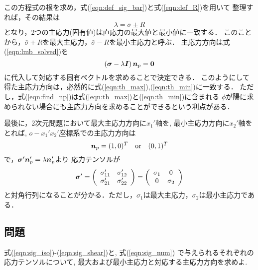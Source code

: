 \documentclass[10pt,a4j]{jbook}
\begin{document}
この方程式の根を求め，式(\ref{eqn:def_sig_bar})と式(\ref{eqn:def_R})を用いて
整理すれば，その結果は
\begin{equation}
	\lambda=\bar \sigma \pm R
	\label{eqn:lmb_solved}
\end{equation}
となり，2つの主応力(固有値)は直応力の最大値と最小値に一致する．
このことから，$\bar \sigma +R$を最大主応力，$\bar \sigma-R$を最小主応力と呼ぶ．
主応力方向は式(\ref{eqn:lmb_solved})を
\begin{equation}
	\left( \mbox{\boldmath $\sigma$} -\lambda \mbox{\boldmath $I$} \right) \mbox{\boldmath $n$}_p=\mbox{\boldmath $0$}
	\label{eqn:find_np}
\end{equation}
に代入して対応する固有ベクトルを求めることで決定できる．
このようにして得た主応力方向は，必然的に式(\ref{eqn:th_max}),(\ref{eqn:th_min})に一致する．
ただし，式(\ref{eqn:find_np})は式(\ref{eqn:th_max})と(\ref{eqn:th_min})に含まれる
$\phi$が陽に求められない場合にも主応力方向を求めることができるという利点がある．

最後に，2次元問題において最大主応力方向に$x_1'$軸を, 最小主応力方向に$x_2'$軸を
とれば, $o-x_1'x_2'$座標系での主応力方向は
\begin{equation}
	\mbox{\boldmath $n$}_p=(1,0)^T \quad {\rm or} \quad (0,1)^T
\end{equation}
で，$\mbox{\boldmath $\sigma$}'\mbox{\boldmath $n$}_p'=\lambda \mbox{\boldmath $n$}_p'$より
応力テンソルが
\begin{equation}
	\mbox{\boldmath $\sigma$}'
	=
	\left(
	\begin{array}{cc}
		\sigma_{11}' & \sigma_{12}' \\
		\sigma_{21}' & \sigma_{22}' 
	\end{array}
	\right)
	=
	\left(
	\begin{array}{cc}
		\sigma_1 & 0 \\
		0 & \sigma_2
	\end{array}
	\right)
\end{equation}
と対角行列になることが分かる．ただし，$\sigma_1$は最大主応力，$\sigma_2$は最小主応力である．
\subsection{問題}
式(\ref{eqn:sig_iso})-(\ref{eqn:sig_shear})と, 式(\ref{eqn:sig_num})
で与えられるそれぞれの応力テンソルについて, 最大および最小主応力と対応する主応力方向を求めよ. 
\end{document}
